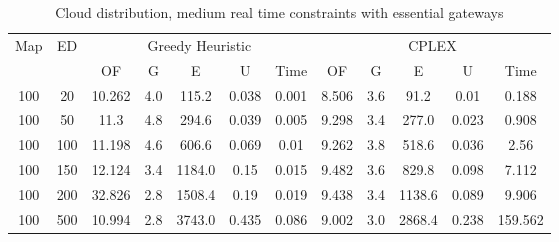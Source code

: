 \begin{table}[htb]
	\centering
	\begin{tabular}{|c|c|c|c|c|c|c|c|c|c|c|c|}
		\hline
		\multirow{2}{*}{Map} & \multirow{2}{*}{ED} & \multicolumn{5}{c|}{Greedy Heuristic} & \multicolumn{5}{c|}{CPLEX}\\ 
		\cline{3-12}
&& OF & G & E & U & Time & OF & G & E & U & Time\\ 
		\hline
		100 & 20 & 10.262 & 4.0 & 115.2 & 0.038 & 0.001 & 8.506 & 3.6 & 91.2 & 0.01 & 0.188 \\ 
		100 & 50 & 11.3 & 4.8 & 294.6 & 0.039 & 0.005 & 9.298 & 3.4 & 277.0 & 0.023 & 0.908 \\ 
		100 & 100 & 11.198 & 4.6 & 606.6 & 0.069 & 0.01 & 9.262 & 3.8 & 518.6 & 0.036 & 2.56 \\ 
		100 & 150 & 12.124 & 3.4 & 1184.0 & 0.15 & 0.015 & 9.482 & 3.6 & 829.8 & 0.098 & 7.112 \\ 
		100 & 200 & 32.826 & 2.8 & 1508.4 & 0.19 & 0.019 & 9.438 & 3.4 & 1138.6 & 0.089 & 9.906 \\ 
		100 & 500 & 10.994 & 2.8 & 3743.0 & 0.435 & 0.086 & 9.002 & 3.0 & 2868.4 & 0.238 & 159.562 \\ 
		\hline 
	\end{tabular} 
	\caption{Cloud distribution, medium real time constraints with essential gateways} 
	\label{tab:cloud_medium_esc} 
\end{table} 

